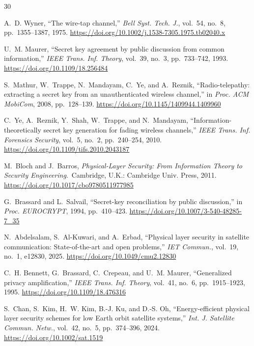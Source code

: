 \documentclass[conference,a4paper]{IEEEtran}
\begin{document}
\begin{thebibliography}{30}

A.~D. Wyner, ``The wire-tap channel,'' \emph{Bell Syst. Tech. J.}, vol.~54, no.~8, pp.~1355--1387, 1975.
\url{https://doi.org/10.1002/j.1538-7305.1975.tb02040.x}

U.~M. Maurer, ``Secret key agreement by public discussion from common information,'' \emph{IEEE Trans. Inf. Theory}, vol.~39, no.~3, pp.~733--742, 1993.
\url{https://doi.org/10.1109/18.256484}

S.~Mathur, W.~Trappe, N.~Mandayam, C.~Ye, and A.~Reznik, ``Radio-telepathy: extracting a secret key from an unauthenticated wireless channel,'' in \emph{Proc. ACM MobiCom}, 2008, pp.~128--139.
\url{https://doi.org/10.1145/1409944.1409960}

C.~Ye, A.~Reznik, Y.~Shah, W.~Trappe, and N.~Mandayam, ``Information-theoretically secret key generation for fading wireless channels,'' \emph{IEEE Trans. Inf. Forensics Security}, vol.~5, no.~2, pp.~240--254, 2010.
\url{https://doi.org/10.1109/tifs.2010.2043187}

M.~Bloch and J.~Barros, \emph{Physical-Layer Security: From Information Theory to Security Engineering}.\ Cambridge, U.K.: Cambridge Univ. Press, 2011.
\url{https://doi.org/10.1017/cbo9780511977985}

G.~Brassard and L.~Salvail, ``Secret-key reconciliation by public discussion,'' in \emph{Proc. EUROCRYPT}, 1994, pp.~410--423.
\url{https://doi.org/10.1007/3-540-48285-7_35}

N.~Abdelsalam, S.~Al-Kuwari, and A.~Erbad, ``Physical layer security in satellite communication: State-of-the-art and open problems,'' \emph{IET Commun.}, vol.~19, no.~1, e12830, 2025.
\url{https://doi.org/10.1049/cmu2.12830}

C.~H. Bennett, G.~Brassard, C.~Crepeau, and U.~M. Maurer, ``Generalized privacy amplification,'' \emph{IEEE Trans. Inf. Theory}, vol.~41, no.~6, pp.~1915--1923, 1995.
\url{https://doi.org/10.1109/18.476316}

S.~Chan, S.~Kim, H.~W. Kim, B.-J. Ku, and D.-S. Oh, ``Energy-efficient physical layer security schemes for low Earth orbit satellite systems,'' \emph{Int. J. Satellite Commun. Netw.}, vol.~42, no.~5, pp.~374--396, 2024.
\url{https://doi.org/10.1002/sat.1519}


\end{thebibliography}
\end{document}
